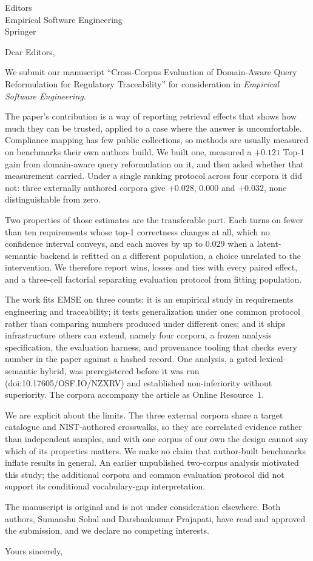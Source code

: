 \documentclass[11pt]{letter}
\date{\today}
\begin{document}
\begin{letter}{Editors\\
Empirical Software Engineering\\
Springer}

\opening{Dear Editors,}

We submit our manuscript ``Cross-Corpus Evaluation of Domain-Aware Query
Reformulation for Regulatory Traceability'' for consideration in
\emph{Empirical Software Engineering}.

The paper's contribution is a way of reporting retrieval effects that shows
how much they can be trusted, applied to a case where the answer is
uncomfortable. Compliance mapping has few public collections, so methods are
usually measured on benchmarks their own authors build. We built one, measured
a $+0.121$ Top-1 gain from domain-aware query reformulation on it, and then
asked whether that measurement carried. Under a single ranking protocol
across four corpora it did not: three externally authored corpora give
$+0.028$, $0.000$ and $+0.032$, none distinguishable from zero.

Two properties of those estimates are the transferable part. Each turns on
fewer than ten requirements whose top-1 correctness changes at all, which no
confidence interval conveys, and each moves by up to $0.029$ when a
latent-semantic backend is refitted on a different population, a choice
unrelated to the intervention. We therefore report wins, losses and ties with
every paired effect, and a three-cell factorial separating evaluation protocol
from fitting population.

The work fits EMSE on three counts: it is an empirical study in requirements
engineering and traceability; it tests generalization under one common
protocol rather than comparing numbers produced under different ones; and it
ships infrastructure others can extend, namely four corpora, a frozen analysis
specification, the evaluation harness, and provenance tooling that checks
every number in the paper against a hashed record. One analysis, a gated
lexical--semantic hybrid, was preregistered before it was run
(doi:10.17605/OSF.IO/NZXRV) and established non-inferiority without
superiority. The corpora accompany the article as Online Resource~1.

We are explicit about the limits. The three external corpora share a target
catalogue and NIST-authored crosswalks, so they are correlated evidence rather
than independent samples, and with one corpus of our own the design cannot say
which of its properties matters. We make no claim that author-built benchmarks
inflate results in general. An earlier unpublished two-corpus analysis
motivated this study; the additional corpora and common evaluation protocol
did not support its conditional vocabulary-gap interpretation.

The manuscript is original and is not under consideration elsewhere. Both
authors, Sumanshu Sohal and Darshankumar Prajapati, have read and approved the
submission, and we declare no competing interests.

\closing{Yours sincerely,}

\end{letter}
\end{document}
